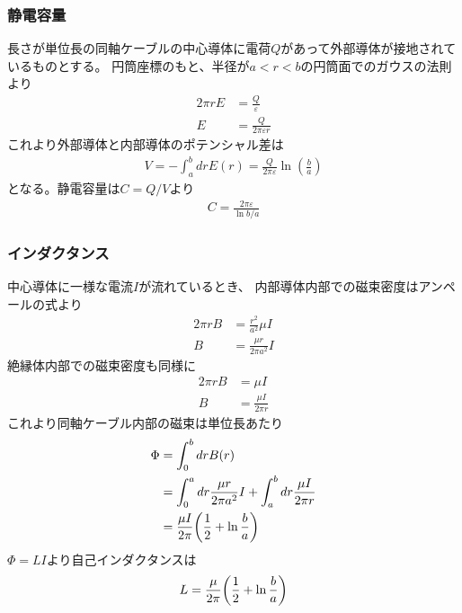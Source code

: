 \documentclass[../../master.tex]{subfiles}
\begin{document}
\subsubsection{静電容量}
長さが単位長の同軸ケーブルの中心導体に電荷\(Q\)があって外部導体が接地されているものとする。
円筒座標のもと、半径が\(a<r<b\)の円筒面でのガウスの法則より
\begin{align}
    2\pi r E &= \frac{Q}{\varepsilon}\\
    E &= \frac{Q}{2\pi \varepsilon r}
\end{align}
これより外部導体と内部導体のポテンシャル差は
\begin{align}
    V = -\int_a^b dr E(r) = \frac{Q}{2\pi\varepsilon}\ln(\frac{b}{a})
\end{align}
となる。静電容量は\(C = Q/V\)より
\begin{align}
    C = \frac{2\pi \varepsilon}{\ln b/a}
\end{align}
\subsubsection{インダクタンス}
中心導体に一様な電流\(I\)が流れているとき、
内部導体内部での磁束密度はアンペールの式より
\begin{align}
    2\pi r B &= \frac{r^2}{a^2}\mu I\\
    B &= \frac{\mu r}{2\pi a^2} I
\end{align}
絶縁体内部での磁束密度も同様に
\begin{align}
    2\pi r B &= \mu I\\
    B &= \frac{\mu I}{2\pi r}
\end{align}
これより同軸ケーブル内部の磁束は単位長あたり
\begin{align}
    \Phi
    &= \int_{0}^{b} dr B(r)\\
    &= \int_{0}^{a} dr \frac{\mu r}{2\pi a^2} I + \int_{a}^{b} dr \frac{\mu I}{2\pi r}\\
    &= \frac{\mu I}{2\pi}\qty(\frac{1}{2}+\ln\frac{b}{a})
\end{align}
\(\Phi=LI\)より自己インダクタンスは
\begin{align}
    L = \frac{\mu}{2\pi}\qty(\frac{1}{2}+\ln\frac{b}{a})
\end{align}
\end{document}
